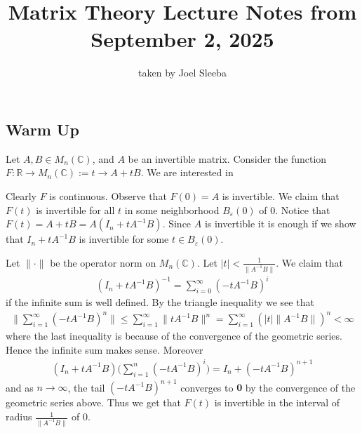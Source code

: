 \documentclass[12pt]{article}
\date{} %
\author{} %
\newcommand\lecdat{September 2, 2025} %
\newcommand\notesby{Joel Sleeba}%
\theoremstyle{definition}
\theoremstyle{remark}
\begin{document}
\title{Matrix Theory \linebreak
  Lecture Notes
from \lecdat}
\author{taken by \notesby}
\maketitle

\normalsize

\setcounter{section}{1}
\setcounter{subsection}{6}
\setcounter{thm}{22}

\subsection*{Warm Up}
Let $A, B \in M_n(\mathbb{C})$, and $A$ be an invertible matrix.
Consider the function $F: \mathbb{R} \to M_n(\mathbb{C}) := t \to A +
tB$. We are interested in

Clearly $F$ is continuous. Observe that $F(0) = A$ is invertible. We
claim that $F(t)$ is invertible for all $t$ in some neighborhood
$B_\varepsilon(0)$ of $0$. Notice that $F(t) = A + tB = A(I_n + t A^{-1}B)$.
Since $A$ is invertible it is enough if we show that $I_n + tA^{-1}B$
is invertible for some $t \in B_\varepsilon(0)$.

Let $\| \cdot \|$ be the operator norm on $M_n(\mathbb{C})$.
Let $|t| < \frac{1}{\|A^{-1} B\|}$. We claim that
\begin{align*}
  (I_n + tA^{-1}B)^{-1} = \sum_{i = 0}^\infty (- tA^{-1}B)^i
\end{align*}
if the infinite sum is well defined. By the triangle inequality we see that
\begin{align*}
  \Big \| \sum_{i = 1}^{\infty} (-tA^{-1}B)^n \Big \| \le \sum_{i =
  1}^{\infty}  \|tA^{-1}B\|^n = \sum_{i = 1}^{\infty}
  (|t|\|A^{-1}B\|)^n < \infty
\end{align*}
where the last inequality is because of the convergence of the
geometric series. Hence the infinite sum makes sense.
Moreover
\begin{align*}
  (I_n + tA^{-1}B) \Big(  \sum_{i = 1}^{n} (-t A^{-1}B)^i\Big) = I_n
  + (-t A^{-1}B)^{n+1}
\end{align*}
and as $n \to \infty$, the tail $(-tA^{-1}B)^{n+1}$ converges to $\textbf{0}$
by the convergence of the geometric series above. Thus we get that
$F(t)$ is invertible in the interval of radius $\frac{1}{\|A^{-1}B\|}$ of $0$.
\end{document}
